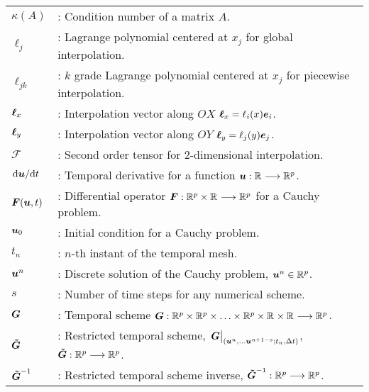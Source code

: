 \begin{tabular}{ll}
	 $\kappa(A)$ & :  Condition number of a matrix $A$.\\
	
	 $\ell_j$ & :  Lagrange polynomial centered at $x_j$ for global interpolation.\\
	 $\ell_{jk}$ & :  $k$ grade Lagrange polynomial centered at $x_j$ for piecewise interpolation.\\
	 $\boldsymbol{\ell}_x$ & :  Interpolation vector along $OX$ $\boldsymbol{\ell}_x = \ell_i(x) \boldsymbol{e}_i $.\\
	 $\boldsymbol{\ell}_y$ & :  Interpolation vector along $OY$ $\boldsymbol{\ell}_y = \ell_j(y) \boldsymbol{e}_j $.\\
	 $\mathcal{F}$ & :  Second order tensor for 2-dimensional interpolation.\\
	
	 $\dv*{\boldsymbol{u}}{t} $ & :  Temporal derivative for a function $\boldsymbol{u} : \mathbb{R}^{} \longrightarrow \mathbb{R}^{p}$.\\
	
	 $ \boldsymbol{F}(\boldsymbol{u},t)$ & :  Differential operator $\boldsymbol{F} : \mathbb{R}^{p}\times\mathbb{R}^{} \longrightarrow \mathbb{R}^{p}$ for a Cauchy problem.\\
	
	 $\boldsymbol{u}_0$ & :  Initial condition for a Cauchy problem.\\
	
	 $t_n$ & :  $n$-th instant of the temporal mesh.\\
	
	 $\boldsymbol{u}^n$ & :  Discrete solution of the Cauchy problem, $\boldsymbol{u}^n \in \mathbb{R}^{p}$.\\
	
	 $s$ & :  Number of time steps for any numerical scheme. \\
	
	
	 $\boldsymbol{G}$ & :  Temporal scheme $ \boldsymbol{G} : \mathbb{R}^{p}\times \mathbb{R}^{p}\times\ldots\times\mathbb{R}^{p} \times\mathbb{R}^{}\times\mathbb{R}^{}  \longrightarrow \mathbb{R}^{p}$.\\
	
	 $\boldsymbol{\tilde{G}}$ & :  Restricted temporal scheme,
	 $\eval{\vect{G}}_{(\vect{u}^{n}, \ldots \vect{u}^{n+1-s};t_n, \Delta t )}$,       $\boldsymbol{\tilde{G}} : \mathbb{R}^{p} \longrightarrow \mathbb{R}^{p}$.\\
	
	 $\boldsymbol{\tilde{G}}^{-1}$ & :  Restricted temporal scheme inverse, $\boldsymbol{\tilde{G}}^{-1} : \mathbb{R}^{p} \longrightarrow \mathbb{R}^{p}$.\\
	
  

\end{tabular}

